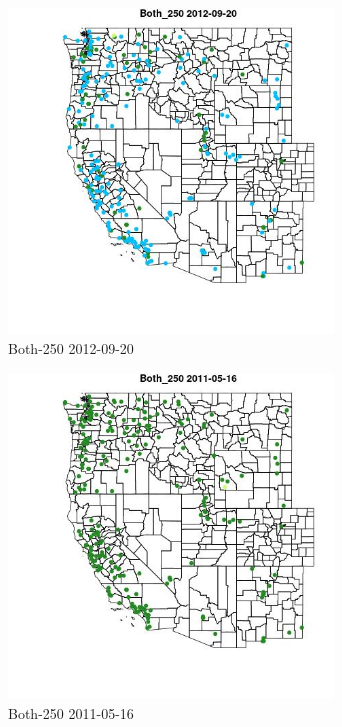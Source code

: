 \begin{figure} 
\centering  
\includegraphics[width=0.77\textwidth]{Code_Outputs/ML_input_report_ML_input_PM25_Step5_part_d_de_duplicated_aves_ML_input_MapObsBoth_2502012-09-20.jpg} 
\caption{\label{fig:ML_input_report_ML_input_PM25_Step5_part_d_de_duplicated_aves_ML_inputMapObsBoth_2502012-09-20}Both-250 2012-09-20} 
\end{figure} 
 

\begin{figure} 
\centering  
\includegraphics[width=0.77\textwidth]{Code_Outputs/ML_input_report_ML_input_PM25_Step5_part_d_de_duplicated_aves_ML_input_MapObsBoth_2502011-05-16.jpg} 
\caption{\label{fig:ML_input_report_ML_input_PM25_Step5_part_d_de_duplicated_aves_ML_inputMapObsBoth_2502011-05-16}Both-250 2011-05-16} 
\end{figure} 
 

